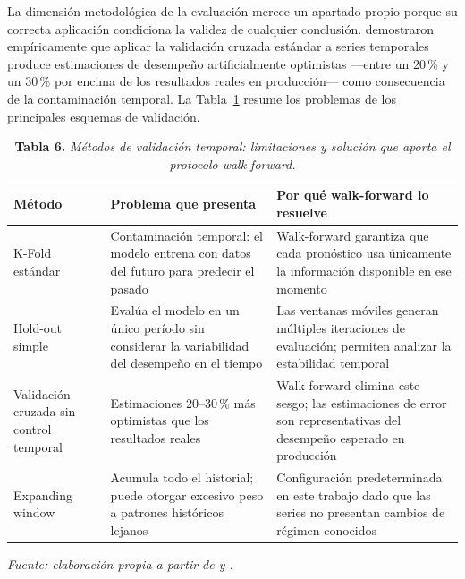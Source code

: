 La dimensión metodológica de la evaluación merece un apartado propio porque su correcta aplicación condiciona la validez de cualquier conclusión. \textcite{Bergmeir2012} demostraron empíricamente que aplicar la validación cruzada estándar a series temporales produce estimaciones de desempeño artificialmente optimistas ---entre un 20\,\% y un 30\,\% por encima de los resultados reales en producción--- como consecuencia de la contaminación temporal. La Tabla~\ref{tab:validacion} resume los problemas de los principales esquemas de validación.

\begin{table}[H]
\caption{\textbf{Tabla 6.} \textit{Métodos de validación temporal: limitaciones y solución que aporta el protocolo walk-forward.}}
\label{tab:validacion}
\vspace{4pt}
\begin{tabular}{>{\raggedright\arraybackslash}p{3.5cm} >{\raggedright\arraybackslash}p{4.5cm} >{\raggedright\arraybackslash}p{5.5cm}}
\toprule
\textbf{Método} & \textbf{Problema que presenta} & \textbf{Por qué walk-forward lo resuelve} \\
\midrule
K-Fold estándar & Contaminación temporal: el modelo entrena con datos del futuro para predecir el pasado & Walk-forward garantiza que cada pronóstico usa únicamente la información disponible en ese momento \parencite{Bergmeir2012} \\
Hold-out simple & Evalúa el modelo en un único período sin considerar la variabilidad del desempeño en el tiempo & Las ventanas móviles generan múltiples iteraciones de evaluación; permiten analizar la estabilidad temporal \parencite{Bergmeir2012} \\
Validación cruzada sin control temporal & Estimaciones 20--30\,\% más optimistas que los resultados reales \parencite{Bergmeir2012} & Walk-forward elimina este sesgo; las estimaciones de error son representativas del desempeño esperado en producción \\
Expanding window & Acumula todo el historial; puede otorgar excesivo peso a patrones históricos lejanos & Configuración predeterminada en este trabajo dado que las series no presentan cambios de régimen conocidos \parencite{Hyndman2021} \\
\bottomrule
\end{tabular}
\vspace{4pt}

\small\textit{Fuente: elaboración propia a partir de \textcite{Bergmeir2012} y \textcite{Hyndman2021}.}
\end{table}

